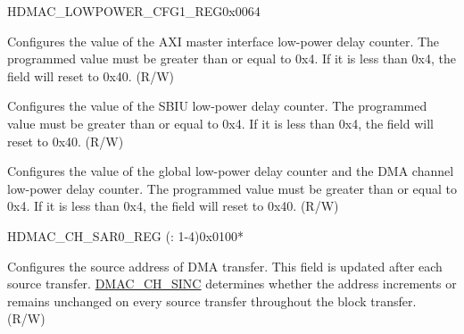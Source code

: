 \begin{register}{H}{DMAC\_LOWPOWER\_CFG1\_REG}{0x0064}\label{regdesc:DMACLOWPOWERCFG1REG}
%
%
%
%
\regnewline%
\begin{regdesc}\begin{reglist}
\label{fielddesc:DMACGLCHLPDLY}\item [DMAC\_GLCH\_LPDLY] Configures the value of the AXI master interface low-power delay counter. The programmed value must be greater than or equal to 0x4. If it is less than 0x4, the field will reset to 0x40. (R/W)
\label{fielddesc:DMACSBIULPDLY}\item [DMAC\_SBIU\_LPDLY] Configures the value of the SBIU low-power delay counter. The programmed value must be greater than or equal to 0x4. If it is less than 0x4, the field will reset to 0x40. (R/W)
\label{fielddesc:DMACMXIFLPDLY}\item [DMAC\_MXIF\_LPDLY] Configures the value of the global low-power delay counter and the DMA channel low-power delay counter. The programmed value must be greater than or equal to 0x4. If it is less than 0x4, the field will reset to 0x40. (R/W)
\end{reglist}\end{regdesc}
\end{register}


\begin{register}{H}{DMAC\_CH\_SAR0\_REG (: 1-4)}{0x0100*}\label{regdesc:DMACCHNSAR0REG}
%
\regnewline%
\begin{regdesc}\begin{reglist}
\label{fielddesc:DMACCHNSAR0}\item [DMAC\_CH\regindex{n}\_SAR0] Configures the source address of DMA transfer. This field is updated after each source transfer. \hyperref[fielddesc:DMACCHNSINC]{DMAC\_CH\_SINC} determines whether the address increments or remains unchanged on every source transfer throughout the block transfer. (R/W)
\end{reglist}\end{regdesc}
\end{register}

